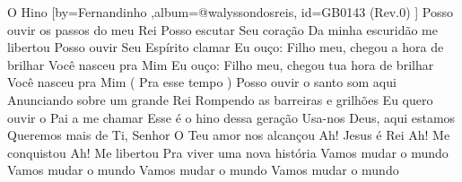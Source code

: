 \beginsong
{O Hino %
}[by={Fernandinho %
},album={@walyssondosreis},
id={GB0143 %
(Rev.0) %
}]
\beginverse*
Posso ouvir os passos do meu Rei
Posso escutar Seu coração
Da minha escuridão me libertou
Posso ouvir Seu Espírito clamar
\endverse
\beginverse*
Eu ouço: Filho meu, chegou a hora de brilhar
Você nasceu pra Mim
Eu ouço: Filho meu, chegou tua hora de brilhar
Você nasceu pra Mim
( Pra esse tempo )
\endverse
\beginverse*
Posso ouvir o santo som aqui
Anunciando sobre um grande Rei
Rompendo as barreiras e grilhões
Eu quero ouvir o Pai a me chamar
\endverse
\beginchorus
Esse é o hino dessa geração
Usa-nos Deus, aqui estamos
Queremos mais de Ti, Senhor
O Teu amor nos alcançou
\endchorus
\beginverse*
Ah! Jesus é Rei
Ah! Me conquistou
Ah! Me libertou
Pra viver uma nova história
\endverse
\beginverse*
Vamos mudar o mundo
Vamos mudar o mundo
Vamos mudar o mundo
Vamos mudar o mundo
\endverse

